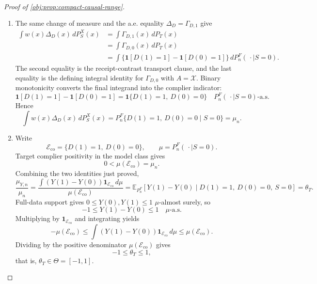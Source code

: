 \documentclass[11pt]{article}
\begin{document}
\begin{proof}[Proof of \cref{obj:prop:compact-causal-range}]
\begin{enumerate}
\item The same change of measure and the a.e. equality \(\Delta_D=\Gamma_{D,1}\) give
\[
\begin{aligned}
\int w(x)\Delta_D(x)\,dP_S^X(x)
&=
\int \Gamma_{D,1}(x)\,dP_T(x)\\
&=
\int \Gamma_{D,0}(x)\,dP_T(x)\\
&=
\int \{\mathbf 1[D(1)=1]-\mathbf 1[D(0)=1]\}\,dP_n^F(\,\cdot\mid S=0).
\end{aligned}
\]
The second equality is the receipt-contrast transport clause, and the last equality is the defining integral identity for \(\Gamma_{D,0}\) with \(A=\mathcal X\).  Binary monotonicity converts the final integrand into the complier indicator:
\[
\mathbf 1[D(1)=1]-\mathbf 1[D(0)=1]
=
\mathbf 1\{D(1)=1,\ D(0)=0\}
\quad
P_n^F(\,\cdot\mid S=0)\text{-a.s.}
\]
Hence
\[
\int w(x)\Delta_D(x)\,dP_S^X(x)
=
P_n^F\{D(1)=1,\ D(0)=0\mid S=0\}
=
\mu_n.
\]

\item Write
\[
\mathcal E_{\mathrm{co}}
=
\{D(1)=1,\ D(0)=0\},
\qquad
\mu=P_n^F(\,\cdot\mid S=0).
\]
Target complier positivity in the model class gives
\[
0<\mu(\mathcal E_{\mathrm{co}})=\mu_n.
\]
Combining the two identities just proved,
\[
\frac{\mu_{Y,n}}{\mu_n}
=
\frac{\int (Y(1)-Y(0))\mathbf 1_{\mathcal E_{\mathrm{co}}}\,d\mu}
{\mu(\mathcal E_{\mathrm{co}})}
=
\mathbb E_{P_n^F}\!\left[
Y(1)-Y(0)\mid D(1)=1,\ D(0)=0,\ S=0
\right]
=
\theta_T .
\]
Full-data support gives \(0\le Y(0),Y(1)\le1\) \(\mu\)-almost surely, so
\[
-1\le Y(1)-Y(0)\le1
\quad \mu\text{-a.s.}
\]
Multiplying by \(\mathbf 1_{\mathcal E_{\mathrm{co}}}\) and integrating yields
\[
-\mu(\mathcal E_{\mathrm{co}})
\le
\int (Y(1)-Y(0))\mathbf 1_{\mathcal E_{\mathrm{co}}}\,d\mu
\le
\mu(\mathcal E_{\mathrm{co}}).
\]
Dividing by the positive denominator \(\mu(\mathcal E_{\mathrm{co}})\) gives
\[
-1\le \theta_T\le1,
\]
that is, \(\theta_T\in\Theta=[-1,1]\). %
\end{enumerate}
\end{proof}
\end{document}
